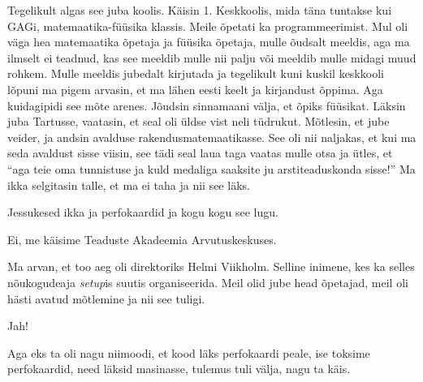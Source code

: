 

Tegelikult algas see juba koolis. Käisin 1. Keskkoolis, mida täna tuntakse kui GAGi, matemaatika-füüsika klassis. Meile õpetati ka programmeerimist. Mul oli väga hea matemaatika õpetaja ja füüsika õpetaja, mulle õudsalt meeldis, aga ma ilmselt ei teadnud, kas see meeldib mulle nii palju või meeldib mulle midagi muud rohkem. Mulle meeldis jubedalt kirjutada ja tegelikult kuni kuskil keskkooli lõpuni ma pigem arvasin, et ma lähen eesti keelt ja kirjandust õppima. Aga kuidagipidi see mõte arenes. Jõudsin sinnamaani välja, et õpiks füüsikat. Läksin juba Tartusse, vaatasin, et seal oli üldse vist neli tüdrukut. Mõtlesin, et jube veider, ja andsin avalduse rakendusmatemaatikasse. See oli nii naljakas, et kui ma seda avaldust sisse viisin, see tädi seal laua taga vaatas mulle otsa ja ütles, et \enquote{aga teie oma  tunnistuse ja kuld medaliga saaksite ju arstiteaduskonda sisse!} Ma ikka selgitasin talle, et ma ei taha ja nii see läks. 


Jessukesed ikka ja perfokaardid ja kogu kogu see lugu. 


Ei, me käisime Teaduste Akadeemia Arvutuskeskuses.


Ma arvan, et too aeg oli direktoriks Helmi Viikholm. Selline inimene, kes ka selles nõukogudeaja \emph{setup}is suutis organiseerida. Meil olid jube head õpetajad, meil oli hästi avatud mõtlemine ja nii see tuligi.


Jah!

Aga eks ta oli nagu niimoodi, et kood läks perfokaardi peale, ise toksime perfokaardid, need läksid masinasse, tulemus tuli välja, nagu ta käis. 


